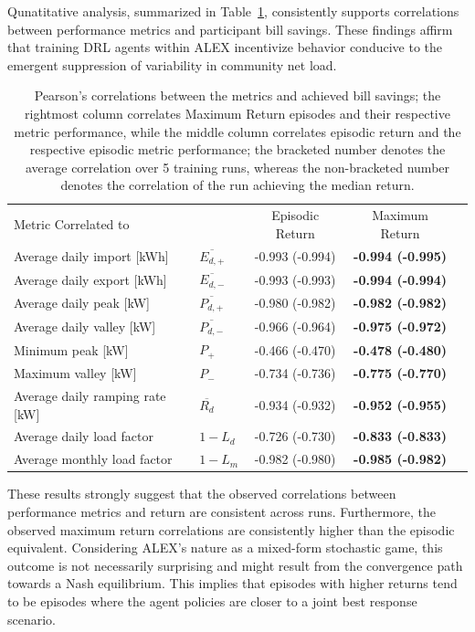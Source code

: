 \documentclass[preprint, 12pt]{elsarticle}
\begin{document}
Qunatitative analysis, summarized in Table~\ref{tab:Correlations}, consistently supports correlations between performance metrics and participant bill savings. These findings affirm that training DRL agents within ALEX incentivize behavior conducive to the emergent suppression of variability in community net load.
\begin{table}[h]
    \centering
    \begin{tabular}{ll | c | c | c}
         Metric Correlated to & & Episodic Return & Maximum Return \\
            Average daily import [kWh] & $\overline{E_{d, +}}$  & -0.993 (-0.994) & \textbf{-0.994 (-0.995)} \\
            Average daily export [kWh] & $\overline{E_{d, -}}$ & -0.993 (-0.993) & \textbf{-0.994 (-0.994)} \\
            Average daily peak [kW] & $\overline{P_{d,+}}$ & -0.980 (-0.982) & \textbf{-0.982 (-0.982)} \\
            Average daily valley [kW] & $\overline{P_{d,-}}$ & -0.966 (-0.964)& \textbf{-0.975 (-0.972)} \\
            Minimum peak [kW] & $P_{+}$ & -0.466 (-0.470) & \textbf{-0.478 (-0.480)} \\
            Maximum valley [kW] & $P_{-}$ & -0.734 (-0.736) & \textbf{-0.775 (-0.770)} \\
            Average daily ramping rate [kW] & $\overline{R_{d}}$ & -0.934 (-0.932) & \textbf{-0.952 (-0.955)} \\
            Average daily load factor & $1-L_{d}$ & -0.726 (-0.730)&  \textbf{-0.833 (-0.833)} \\
            Average monthly load factor & $1-L_{m}$ & -0.982 (-0.980) & \textbf{-0.985 (-0.982)} \\
    \end{tabular}
    \caption{Pearson's correlations between the metrics and achieved bill savings; the rightmost column correlates Maximum Return episodes and their respective metric performance, while the middle column correlates episodic return and the respective episodic metric performance; the bracketed number denotes the average correlation over 5 training runs, whereas the non-bracketed number denotes the correlation of the run achieving the median return.}
    \label{tab:Correlations}
\end{table}

These results strongly suggest that the observed correlations between performance metrics and return are consistent across runs. Furthermore, the observed maximum return correlations are consistently higher than the episodic equivalent. Considering ALEX's nature as a mixed-form stochastic game, this outcome is not necessarily surprising and might result from the convergence path towards a Nash equilibrium. This implies that episodes with higher returns tend to be episodes where the agent policies are closer to a joint best response scenario.
\end{document}

